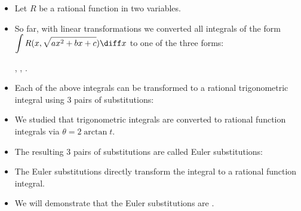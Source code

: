 
\begin{frame}
\begin{itemize}
\item Let $R$ be a rational function in two variables.
\item<2-> So far, with linear transformations we converted all integrals of the form $\displaystyle\int R(x, \sqrt{ax^2+bx+c})\diff x$ to one of the three forms:

,  , .
\item<3-> Each of the above integrals can be transformed to a rational trigonometric integral using 3 pairs of substitutions:

\item<7-> We studied that trigonometric integrals are converted to rational function integrals via $\theta=2\arctan t$.
\item<8-> The resulting 3 pairs of substitutions are called Euler substitutions:
\item<12-> The Euler substitutions directly transform the integral to a rational function integral.
\item<13-> We will demonstrate that the Euler substitutions are .
\end{itemize}

\end{frame}

